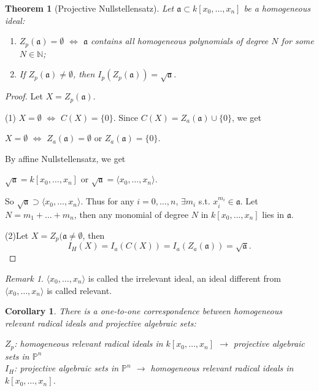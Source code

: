 \documentclass{amsart}
\theoremstyle{plain}
\newtheorem{theorem}{Theorem}
\newtheorem{corollary}{Corollary}
\theoremstyle{definition}
\theoremstyle{remark}
\newtheorem*{remark}{Remark}
\numberwithin{equation}{section}
\begin{document}
\begin{theorem}[Projective Nullstellensatz]
	Let $ \mathfrak{a}\subset k[x_0,\dots,x_n] $ be a homogeneous ideal:
	\begin{enumerate}
	\item $ Z_p(\mathfrak{a})=\emptyset $ $ \Leftrightarrow $ $ \mathfrak{a} $ contains all homogeneous polynomials of degree $ N $ for some $ N\in \mathbb{N} $;
	\item If $ Z_p(\mathfrak{a})\neq \emptyset $, then $ I_p(Z_p(\mathfrak{a}))=\sqrt{\mathfrak{a}} $.
	\end{enumerate}
\end{theorem}
\begin{proof}
	Let $ X=Z_p(\mathfrak{a}) $.
	
	(1) $ X=\emptyset $ $ \Leftrightarrow $ $ C(X)=\{ 0 \} $. Since $ C(X)=Z_a(\mathfrak{a})\cup \{0\} $, we get
	\begin{center}
		$ X=\emptyset $ $ \Leftrightarrow $ $ Z_a(\mathfrak{a})=\emptyset $ or $ Z_a(\mathfrak{a})=\{0\} $.
	\end{center}
	By affine Nullstellensatz, we get 
	\begin{center}
		$ \sqrt{\mathfrak{a}}=k[x_0,\dots,x_n] $ or $ \sqrt{\mathfrak{a}}=\langle x_0,\dots,x_n\rangle $.
	\end{center}
	So $ \sqrt{\mathfrak{a}}\supset \langle x_0,\dots,x_n\rangle $. Thus for any $ i=0,\dots,n $, $ \exists m_i $ s.t. $ x_i^{m_i}\in \mathfrak{a} $. Let $ N=m_1+\dots+m_n $, then any monomial of degree $ N $ in $ k[x_0,\dots,x_n] $ lies in $ \mathfrak{a} $.
	
	(2)Let $ X=Z_p(\mathfrak{a}\neq \emptyset $, then 
		\begin{equation}
		I_H(X)=I_a(C(X))=I_a(Z_a(\mathfrak{a}))=\sqrt{\mathfrak{a}}.
		\end{equation}
\end{proof}
\begin{remark}
	$ \langle x_0,\dots,x_n \rangle $ is called the irrelevant ideal, an ideal different from $ \langle x_0,\dots,x_n \rangle $ is called relevant.
\end{remark}
\begin{corollary}
	There is a one-to-one correspondence between homogeneous relevant radical ideals and projective algebraic sets:
	\begin{center}
		$ Z_p $: homogeneous relevant radical ideals in $ k[x_0,\dots,x_n] $ $ \to $  projective algebraic sets in  $ \mathbb{P}^n $\\
		$ I_H $: projective algebraic sets in $ \mathbb{P}^n $ $ \to $ homogeneous relevant radical ideals in $ k[x_0,\dots,x_n] $.
	\end{center}
\end{corollary}
\end{document}
